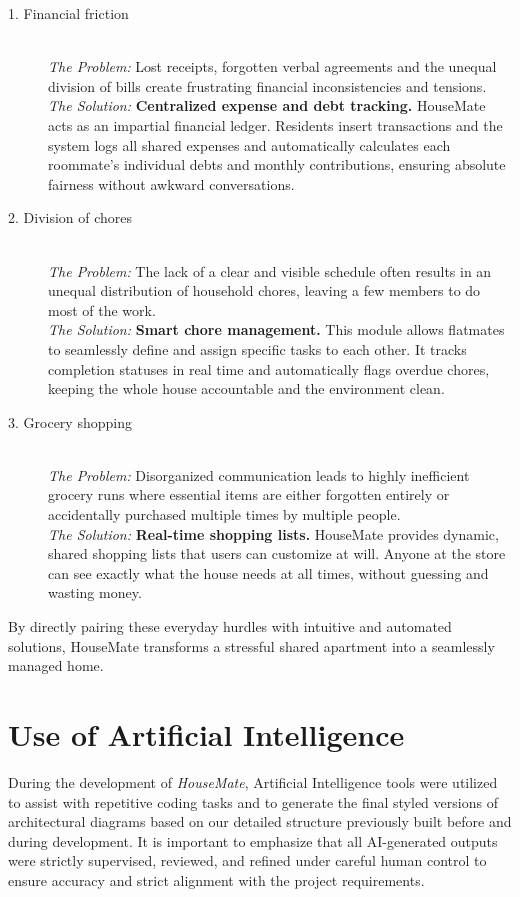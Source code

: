 \begin{description}
    \item[1. Financial friction] \hfill \\
    \textit{The Problem:} Lost receipts, forgotten verbal agreements and the unequal division of bills create frustrating financial inconsistencies and tensions. \\
    \textit{The Solution:} \textbf{Centralized expense and debt tracking.} HouseMate acts as an impartial financial ledger. Residents insert transactions and the system logs all shared expenses and automatically calculates each roommate's individual debts and monthly contributions, ensuring absolute fairness without awkward conversations. 

    \item[2. Division of chores] \hfill \\
    \textit{The Problem:} The lack of a clear and visible schedule often results in an unequal distribution of household chores, leaving a few members to do most of the work. \\
    \textit{The Solution:} \textbf{Smart chore management.} This module allows flatmates to seamlessly define and assign specific tasks to each other. It tracks completion statuses in real time and automatically flags overdue chores, keeping the whole house accountable and the environment clean.

    \item[3. Grocery shopping] \hfill \\
    \textit{The Problem:} Disorganized communication leads to highly inefficient grocery runs where essential items are either forgotten entirely or accidentally purchased multiple times by multiple people. \\
    \textit{The Solution:} \textbf{Real-time shopping lists.} HouseMate provides dynamic, shared shopping lists that users can customize at will. Anyone at the store can see exactly what the house needs at all times, without guessing and wasting money.
\end{description}

By directly pairing these everyday hurdles with intuitive and automated solutions, HouseMate transforms a stressful shared apartment into a seamlessly managed home.

\section{Use of Artificial Intelligence}\label{sec:ai}

During the development of \textit{HouseMate}, Artificial Intelligence tools were utilized to assist with repetitive coding tasks and to generate the final styled versions of architectural diagrams based on our detailed structure previously built before and during development. It is important to emphasize that all AI-generated outputs were strictly supervised, reviewed, and refined under careful human control to ensure accuracy and strict alignment with the project requirements.